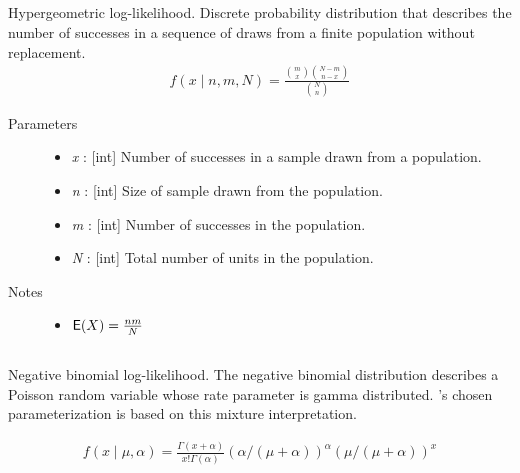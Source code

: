 \documentclass[]{jss}
\begin{document}
\subsection[hypergeometric]{} 

Hypergeometric log-likelihood. Discrete probability distribution that
describes the number of successes in a sequence of draws from a finite
population without replacement.
\begin{eqnarray*}
f(x \mid n, m, N) = \frac{\binom{m}{x}\binom{N-m}{n-x}}{\binom{N}{n}}
\end{eqnarray*}
\begin{description}    
\item[Parameters] \leavevmode\begin{itemize}
\item {} 
\emph{x} : {[}int{]} Number of successes in a sample drawn from a population.

\item {} 
\emph{n} : {[}int{]} Size of sample drawn from the population.

\item {} 
\emph{m} : {[}int{]} Number of successes in the population.

\item {} 
\emph{N} : {[}int{]} Total number of units in the population.

\end{itemize}

\item[Notes] \leavevmode\begin{itemize}
\item $\mathsf{E}(X) = \frac{n m}{N}$
\end{itemize}

\end{description}


\subsection[negative binomial]{}

Negative binomial log-likelihood. The negative binomial distribution describes a
Poisson random variable whose rate parameter is gamma distributed. 's chosen
parameterization is based on this mixture interpretation.

\begin{eqnarray*}
f(x \mid \mu, \alpha) = \frac{\Gamma(x+\alpha)}{x! \Gamma(\alpha)} (\alpha/(\mu+\alpha))^\alpha (\mu/(\mu+\alpha))^x    
\end{eqnarray*}
\end{document}
